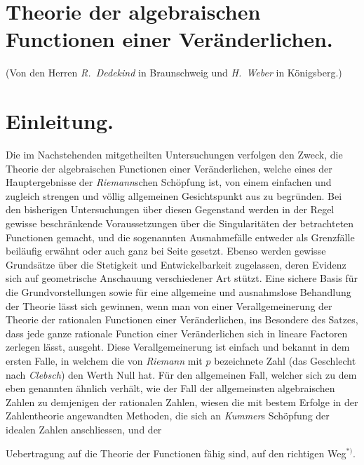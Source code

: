 \documentclass{article}
\begin{document}

\section*{Theorie der algebraischen Functionen einer Veränderlichen.}

(Von den Herren \emph{R.\ Dedekind} in Braunschweig und \emph{H.\ Weber} in Königsberg.)

\section*{Einleitung.}

Die im Nachstehenden mitgetheilten Untersuchungen verfolgen den Zweck, die Theorie der algebraischen Functionen einer Veränderlichen, welche eines der Hauptergebnisse der \emph{Riemann}schen Schöpfung ist, von einem einfachen und zugleich strengen und völlig allgemeinen Gesichtspunkt aus zu begründen. Bei den bisherigen Untersuchungen über diesen Gegenstand werden in der Regel gewisse beschränkende Voraussetzungen über die Singularitäten der betrachteten Functionen gemacht, und die sogenannten Ausnahmefälle entweder als Grenzfälle beiläufig erwähnt oder auch ganz bei Seite gesetzt. Ebenso werden gewisse Grundsätze über die Stetigkeit und Entwickelbarkeit zugelassen, deren Evidenz sich auf geometrische Anschauung verschiedener Art stützt. Eine sichere Basis für die Grundvorstellungen sowie für eine allgemeine und ausnahmslose Behandlung der Theorie lässt sich gewinnen, wenn man von einer Verallgemeinerung der Theorie der rationalen Functionen einer Veränderlichen, ins Besondere des Satzes, dass jede ganze rationale Function einer Veränderlichen sich in lineare Factoren zerlegen lässt, ausgeht. Diese Verallgemeinerung ist einfach und bekannt in dem ersten Falle, in welchem die von \emph{Riemann} mit $p$ bezeichnete Zahl (das Geschlecht nach \emph{Clebsch}) den Werth Null hat. Für den allgemeinen Fall, welcher sich zu dem eben genannten ähnlich verhält, wie der Fall der allgemeinsten algebraischen Zahlen zu demjenigen der rationalen Zahlen, wiesen die mit bestem Erfolge in der Zahlentheorie angewandten Methoden, die sich an \emph{Kummer}s Schöpfung der idealen Zahlen anschliessen, und der

Uebertragung auf die Theorie der Functionen fähig sind, auf den richtigen Weg${}^{*)}$.
\end{document}

